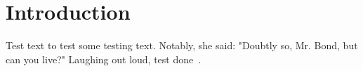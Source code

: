 \chapter{Introduction}

Test text to test some testing text.
Notably, she said: "Doubtly so, Mr. Bond, but can you live?"
Laughing out loud, test done~\cite{web:site:tox}.
